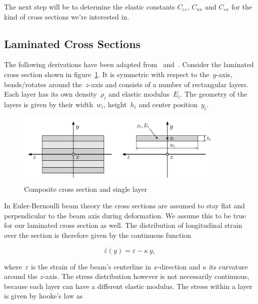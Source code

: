 The next step will be to determine the elastic constants $C_{\varepsilon\varepsilon}$, $C_{\kappa\kappa}$ and $C_{\varepsilon\kappa}$ for the kind of cross sections we're interested in.

\newpage
\subsection{Laminated Cross Sections}

The following derivations have been adapted from~\cite{bib:tm2} and~\cite{bib:wiki-sandwich}. Consider the laminated cross section shown in figure~\ref{fig:composite-sections-1}.
It is symmetric with respect to the~$y$-axis, bends/rotates around the~$z$-axis and consists of a number of rectangular layers. Each layer has its own density~$\rho_i$ and elastic modulus~$E_i$.
The geometry of the layers is given by their width~$w_i$, height~$h_i$ and center position~$y_i$.

\begin{figure}[h]
\centering
\includegraphics[width=0.9\textwidth]{figures/elements/composite-sections-1}
\caption{Composite cross section and single layer}
\label{fig:composite-sections-1}
\end{figure}

In Euler-Bernoulli beam theory the cross sections are assumed to stay flat and perpendicular to the beam axis during deformation.
We assume this to be true for our laminated cross section as well.
The distribution of longitudinal strain over the section is therefore given by the continuous function

\begin{equation}
\overline{\varepsilon}(y) = \varepsilon - \kappa\,y,
\end{equation}

where~$\varepsilon$ is the strain of the beam's centerline in $x$-direction and $\kappa$ its curvature around the $z$-axis.
The stress distribution however is not necessarily continuous, because each layer can have a different elastic modulus.
The stress within a layer is given by hooke's law as

